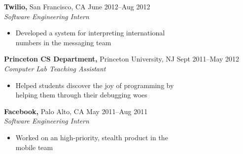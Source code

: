 \documentclass[margin]{res}
\begin{document}
\begin{resume}
 {\bf Twilio,} San Francisco, CA \hfill June 2012--Aug 2012 \\
 {\it Software Engineering Intern}
 \begin{itemize} \itemsep -2pt  %
 \item Developed a system for interpreting international \\ 
   numbers in the messaging team
 \end{itemize}

 {\bf Princeton CS Department,} Princeton University, NJ \hfill Sept 2011--May 2012 \\
 {\it Computer Lab Teaching Assistant}
 \begin{itemize} \itemsep -2pt  %
 \item Helped students discover the joy of programming by \\
   helping them through their debugging woes
 \end{itemize}

 {\bf Facebook,} Palo Alto, CA \hfill May 2011--Aug 2011 \\
 {\it Software Engineering Intern}
 \begin{itemize} \itemsep -2pt  %
 \item Worked on an high-priority, stealth product in the \\
   mobile team
 \end{itemize}




\end{resume}
\end{document}
